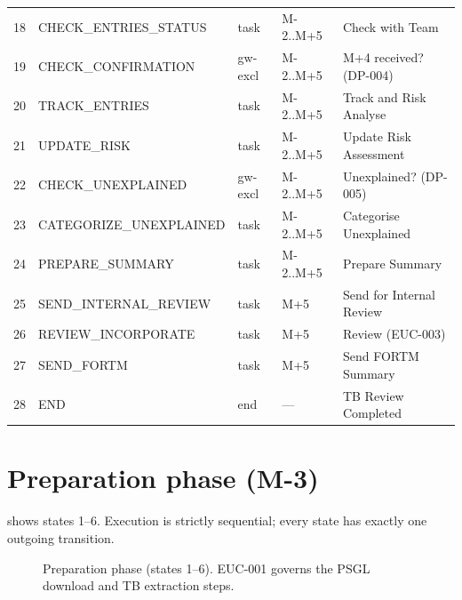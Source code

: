 \begin{table}[htbp]
\begin{tabularx}{\linewidth}{@{}llllX@{}}
18 & CHECK\_ENTRIES\_STATUS        & task         & M-2..M+5   & Check with Team \\
19 & CHECK\_CONFIRMATION           & gw-excl      & M-2..M+5   & M+4 received? (DP-004) \\
20 & TRACK\_ENTRIES                & task         & M-2..M+5   & Track and Risk Analyse \\
21 & UPDATE\_RISK                  & task         & M-2..M+5   & Update Risk Assessment \\
22 & CHECK\_UNEXPLAINED            & gw-excl      & M-2..M+5   & Unexplained? (DP-005) \\
23 & CATEGORIZE\_UNEXPLAINED       & task         & M-2..M+5   & Categorise Unexplained \\
24 & PREPARE\_SUMMARY              & task         & M-2..M+5   & Prepare Summary \\
25 & SEND\_INTERNAL\_REVIEW        & task         & M+5        & Send for Internal Review \\
26 & REVIEW\_INCORPORATE           & task         & M+5        & Review (EUC-003) \\
27 & SEND\_FORTM                   & task         & M+5        & Send FORTM Summary \\
28 & END                           & end          & ---        & TB Review Completed \\
\bottomrule
\end{tabularx}
\end{table}

\section{Preparation phase (M-3)}

 shows states 1--6. Execution is strictly
sequential; every state has exactly one outgoing transition.

\begin{figure}[htbp]
\centering
{}
\caption{Preparation phase (states 1--6). EUC-001 governs the PSGL
download and TB extraction steps.}\label{fig:prep-phase}
\end{figure}

